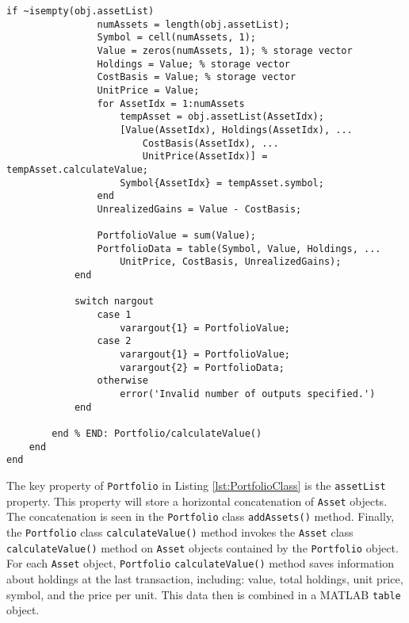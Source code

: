 \begin{lstlisting}[style=Matlab-editor, caption={The class definition for \texttt{Portfolio}, a container class for objects of class \texttt{Asset}.}, label={lst:PortfolioClass}]
            if ~isempty(obj.assetList)
                numAssets = length(obj.assetList);
                Symbol = cell(numAssets, 1);
                Value = zeros(numAssets, 1); % storage vector
                Holdings = Value; % storage vector
                CostBasis = Value; % storage vector
                UnitPrice = Value;
                for AssetIdx = 1:numAssets
                    tempAsset = obj.assetList(AssetIdx);
                    [Value(AssetIdx), Holdings(AssetIdx), ...
                        CostBasis(AssetIdx), ...
                        UnitPrice(AssetIdx)] = tempAsset.calculateValue;
                    Symbol{AssetIdx} = tempAsset.symbol;
                end
                UnrealizedGains = Value - CostBasis;
                
                PortfolioValue = sum(Value);
                PortfolioData = table(Symbol, Value, Holdings, ...
                    UnitPrice, CostBasis, UnrealizedGains);
            end
                
            switch nargout 
                case 1
                    varargout{1} = PortfolioValue;
                case 2
                    varargout{1} = PortfolioValue;
                    varargout{2} = PortfolioData;
                otherwise
                    error('Invalid number of outputs specified.')
            end
                    
        end % END: Portfolio/calculateValue()
    end
end
\end{lstlisting}

The key property of \texttt{Portfolio} in Listing \ref{lst:PortfolioClass} is the \texttt{assetList} property. This property will store a horizontal concatenation of \texttt{Asset} objects. The concatenation is seen in the \texttt{Portfolio} class \texttt{addAssets()} method. Finally, the \texttt{Portfolio} class \texttt{calculateValue()} method invokes the \texttt{Asset} class \texttt{calculateValue()} method on \texttt{Asset} objects contained by the \texttt{Portfolio} object. For each \texttt{Asset} object, \texttt{Portfolio} \texttt{calculateValue()} method saves information about holdings at the last transaction, including: value, total holdings, unit price, symbol, and the price per unit.  This data then is combined in a MATLAB \texttt{table} object. 

